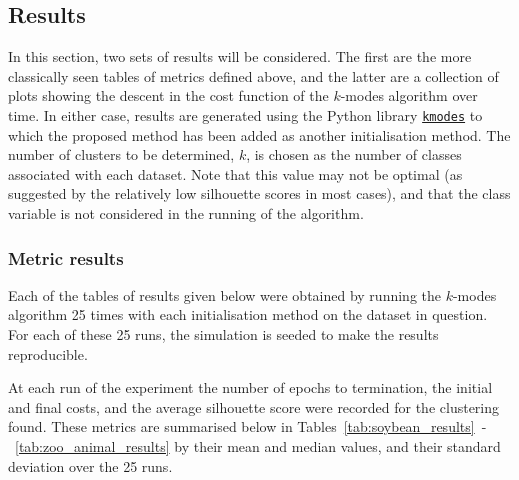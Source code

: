 \subsection{Results}\label{subsec:results}

In this section, two sets of results will be considered. The first are the more
classically seen tables of metrics defined above, and the latter are a
collection of plots showing the descent in the cost function of the \(k\)-modes
algorithm over time. In either case, results are generated using the Python
library \href{https://github.com/nicodv/kmodes}{\texttt{kmodes}} to which the
proposed method has been added as another initialisation method. The number of
clusters to be determined, \(k\), is chosen as the number of classes associated
with each dataset. Note that this value may not be optimal (as suggested by the
relatively low silhouette scores in most cases), and that the class variable is
not considered in the running of the algorithm.

\subsubsection{Metric results}

Each of the tables of results given below were obtained by running the
\(k\)-modes algorithm 25 times with each initialisation method on the dataset in
question. For each of these 25 runs, the simulation is seeded to make the
results reproducible.

At each run of the experiment the number of epochs to termination, the initial
and final costs, and the average silhouette score were recorded for the
clustering found. These metrics are summarised below in
Tables~\ref{tab:soybean_results}~\--~\ref{tab:zoo_animal_results} by their mean
and median values, and their standard deviation over the 25 runs.

\begin{table}
    \centering
    \resizebox{\textwidth}{!}{%
        
    }
    \label{tab:soybean_summary}\vspace{20pt}

    \resizebox{\textwidth}{!}{%
        
    }
    \label{tab:mushroom_summary}\vspace{20pt}

    \resizebox{\textwidth}{!}{%
        
    }
    \label{tab:breast_cancer_summary}\vspace{20pt}

    \resizebox{\textwidth}{!}{%
        
    }
    \label{tab:zoo_summary}
\end{table}

